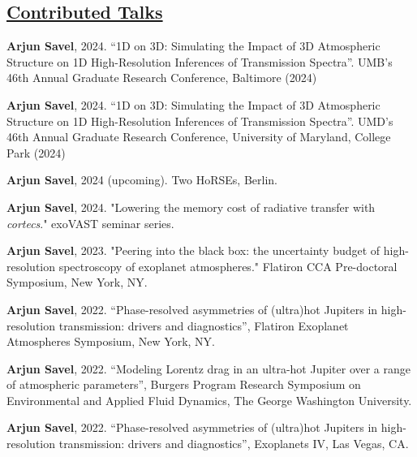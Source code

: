 \documentclass[letterpaper,10.5pt]{article}
\newcommand{\shortershorterSection}[1]{\vspace{-10pt}\subsection{#1}}
\begin{document}
\shortershorterSection{\underline{Contributed Talks}}

\small
  \begin{list}{}{\cvlist}

  \item[{\color{numcolor}\scriptsize13}] \textbf{Arjun Savel}, 2024. ``1D on 3D: Simulating the Impact of 3D Atmospheric Structure on 1D High-Resolution Inferences of Transmission Spectra''. UMB's 46th Annual Graduate Research Conference, Baltimore (2024)
  
    \item[{\color{numcolor}\scriptsize12}] \textbf{Arjun Savel}, 2024. ``1D on 3D: Simulating the Impact of 3D Atmospheric Structure on 1D High-Resolution Inferences of Transmission Spectra''. UMD's 46th Annual Graduate Research Conference, University of Maryland, College Park (2024)

    \item[{\color{numcolor}\scriptsize11}] \textbf{Arjun Savel}, 2024 (upcoming). Two HoRSEs, Berlin.

  \item[{\color{numcolor}\scriptsize10}] \textbf{Arjun Savel}, 2024. "Lowering the memory cost of radiative transfer with \textit{cortecs}." exoVAST seminar series.
  

  \item[{\color{numcolor}\scriptsize9}] \textbf{Arjun Savel}, 2023. "Peering into the black box: 
the uncertainty budget of high-resolution spectroscopy of exoplanet atmospheres." Flatiron CCA Pre-doctoral Symposium, New York, NY.

 \item[{\color{numcolor}\scriptsize8}] \textbf{Arjun Savel}, 2022. ``Phase-resolved asymmetries of (ultra)hot Jupiters in high-resolution transmission: drivers and diagnostics'', Flatiron Exoplanet Atmospheres Symposium, New York, NY.

\item[{\color{numcolor}\scriptsize7}] \textbf{Arjun Savel}, 2022. ``Modeling Lorentz drag in an ultra-hot Jupiter over a range of atmospheric parameters'', Burgers Program Research Symposium on Environmental and Applied Fluid Dynamics, The George Washington University.

     \item[{\color{numcolor}\scriptsize6}] \textbf{Arjun Savel}, 2022. ``Phase-resolved asymmetries of (ultra)hot Jupiters in high-resolution transmission: drivers and diagnostics'', Exoplanets IV, Las Vegas, CA.



\end{list}
\end{document}
